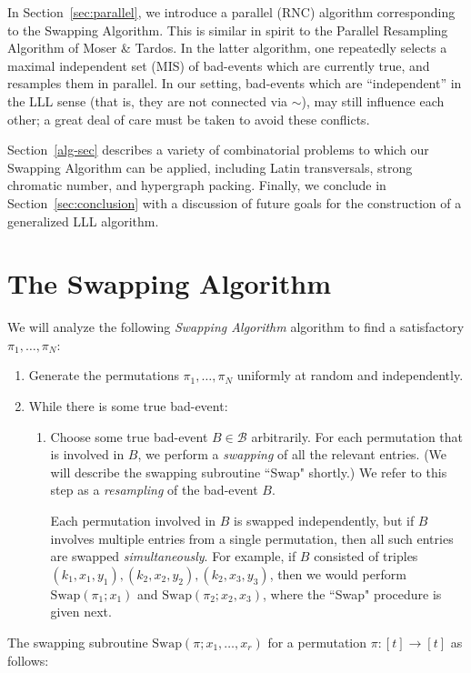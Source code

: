 In Section~\ref{sec:parallel}, we introduce a parallel (RNC) algorithm corresponding to the Swapping Algorithm. This is similar in spirit to the Parallel Resampling Algorithm of Moser \& Tardos. In the latter algorithm, one repeatedly selects a maximal independent set (MIS) of bad-events which are currently true, and resamples them in parallel. In our setting, bad-events which are ``independent'' in the LLL sense (that is, they are not connected via $\sim$), may still influence each other; a great deal of care must be taken to avoid these conflicts.

Section~\ref{alg-sec} describes a variety of combinatorial problems to which our Swapping Algorithm can be applied, including Latin transversals, strong chromatic number, and hypergraph packing. Finally, we conclude in Section~\ref{sec:conclusion} with a discussion of future goals for the construction of a generalized LLL algorithm.

\section{The Swapping Algorithm}
\label{sec:swap-alg}
We will analyze the following \emph{Swapping Algorithm} algorithm to find a satisfactory $\pi_1, \dots, \pi_N$:
\begin{enumerate}
\item Generate the permutations $\pi_1, \dots, \pi_N$ uniformly at random and independently. 
\item While there is some true bad-event:
\begin{enumerate}
\item[(3)] Choose some true bad-event $B \in \mathcal B$ arbitrarily. For each permutation that is involved in $B$, we perform a \emph{swapping} of all the relevant entries. (We will describe the swapping subroutine ``Swap" shortly.) We refer to this step as a \emph{resampling} of the bad-event $B$.

\smallskip 
Each permutation involved in $B$ is swapped independently, but if $B$ involves multiple entries from a single permutation, then all such entries are swapped \emph{simultaneously}. For example, if $B$ consisted of triples $(k_1, x_1, y_1), (k_2, x_2, y_2), (k_2, x_3, y_3)$, then we would perform 
$\text{Swap}(\pi_1; x_1)$ and
$\text{Swap}(\pi_2; x_2, x_3)$, where the ``Swap" procedure is given next. 
\end{enumerate}
\end{enumerate}

\smallskip \noindent
The swapping subroutine $\text{Swap}(\pi; x_1, \dots, x_r)$ for a permutation $\pi: [t] \rightarrow [t]$ as follows:

